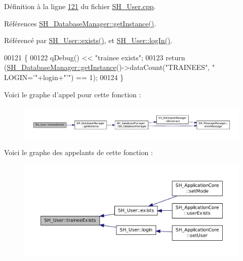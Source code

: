 Définition à la ligne \hyperlink{SH__User_8cpp_source_l00121}{121} du fichier \hyperlink{SH__User_8cpp_source}{S\-H\-\_\-\-User.\-cpp}.



Références \hyperlink{classSH__DatabaseManager_a638369a15265ab0aa053080a32d2ca39}{S\-H\-\_\-\-Database\-Manager\-::get\-Instance()}.



Référencé par \hyperlink{classSH__User_aa83a99478cf6c738f995c5c36345bcd3}{S\-H\-\_\-\-User\-::exists()}, et \hyperlink{classSH__User_ad83af309786cb1ed5dbbd2cdca195c30}{S\-H\-\_\-\-User\-::log\-In()}.


\begin{DoxyCode}
00121                                          \{
00122     qDebug() << \textcolor{stringliteral}{"trainee exists"};
00123     \textcolor{keywordflow}{return} (\hyperlink{classSH__DatabaseManager_a638369a15265ab0aa053080a32d2ca39}{SH\_DatabaseManager::getInstance}()->dataCount(\textcolor{stringliteral}{"TRAINEES"}, \textcolor{stringliteral}{"
      LOGIN='"}+login+\textcolor{stringliteral}{"'"}) == 1);
00124 \}
\end{DoxyCode}


Voici le graphe d'appel pour cette fonction \-:\nopagebreak
\begin{figure}[H]
\begin{center}
\leavevmode
\includegraphics[width=350pt]{classSH__User_af40edc91cf1a4d8065fb43d2899c3dcb_cgraph}
\end{center}
\end{figure}




Voici le graphe des appelants de cette fonction \-:\nopagebreak
\begin{figure}[H]
\begin{center}
\leavevmode
\includegraphics[width=350pt]{classSH__User_af40edc91cf1a4d8065fb43d2899c3dcb_icgraph}
\end{center}
\end{figure}


